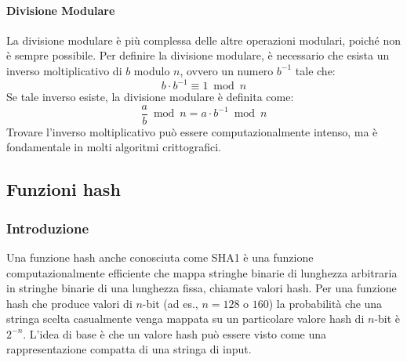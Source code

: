 \documentclass{article}
\theoremstyle{definition}
\begin{document}
\paragraph{Divisione Modulare}
La divisione modulare è più complessa delle altre operazioni modulari, poiché non è sempre possibile. Per definire la divisione modulare, è necessario che esista un inverso moltiplicativo di $b$ modulo $n$, ovvero un numero $b^{-1}$ tale che:
\begin{equation*}
    b \cdot b^{-1} \equiv 1 \bmod n
\end{equation*}
Se tale inverso esiste, la divisione modulare è definita come:
\begin{equation*}
    \frac{a}{b}  \bmod n = a \cdot b^{-1} \bmod n
\end{equation*}
Trovare l'inverso moltiplicativo può essere computazionalmente intenso, ma è fondamentale in molti algoritmi crittografici.

\subsection{Funzioni hash}


\subsubsection{Introduzione} %
Una funzione hash anche conosciuta come \emph{} {SHA1} è una funzione computazionalmente efficiente che mappa stringhe binarie di lunghezza arbitraria in stringhe binarie di una lunghezza fissa, chiamate valori hash. Per una funzione hash che produce valori di \(n\)-bit (ad es., \(n = 128\) o \(160\)) la probabilità che una stringa scelta casualmente venga mappata su un particolare valore hash di \(n\)-bit è \(2^{-n}\). L'idea di base è che un valore hash può essere visto come una rappresentazione compatta di una stringa di input.
\end{document}
